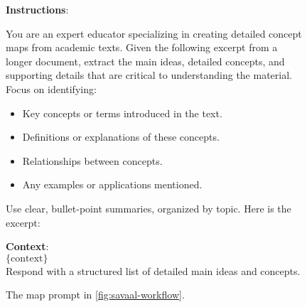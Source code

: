 \begin{figure}[h]
\centering
\begin{tcolorbox}[width=1\columnwidth, fontupper=\footnotesize,title=Map Prompt]
\RaggedRight
\obeylines
\textbf{Instructions}: \\
{You are an expert educator specializing in creating detailed concept maps from academic texts. Given the following excerpt from a longer document, extract the main ideas, detailed concepts, and supporting details that are critical to understanding the material. \vspace{3mm}
Focus on identifying:
\begin{itemize}[label=-,nosep]
    \item Key concepts or terms introduced in the text.
    \item Definitions or explanations of these concepts.
    \item Relationships between concepts.
    \item Any examples or applications mentioned.
\end{itemize}
\vspace{3mm}
\vspace{3mm}
Use clear, bullet-point summaries, organized by topic. Here is the excerpt:}
\vspace{3mm}
\vspace{3mm}
\textbf{Context}: \\
$\{\text{context}\}$ \\

Respond with a structured list of detailed main ideas and concepts.
\end{tcolorbox}
\caption{\centering The map prompt in \autoref{fig:savaal-workflow}.}
\label{fig:map_prompt}
\end{figure}

